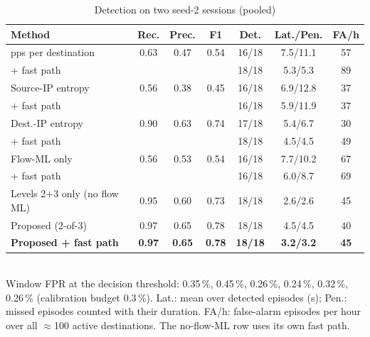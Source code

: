 \documentclass[conference]{IEEEtran}
\begin{document}
\begin{table}[t]
\caption{Detection on two seed-2 sessions (pooled)}
\label{tab:detect}
\centering
\setlength{\tabcolsep}{2.2pt}
\begin{tabular}{lcccccc}
\toprule
Method & Rec. & Prec. & F1 & Det. & Lat./Pen. & FA/h \\
\midrule
pps per destination & 0.63 & 0.47 & 0.54 & 16/18 & 7.5/11.1 & 57 \\
\quad + fast path & & & & 18/18 & 5.3/5.3 & 89 \\
Source-IP entropy & 0.56 & 0.38 & 0.45 & 16/18 & 6.9/12.8 & 37 \\
\quad + fast path & & & & 16/18 & 5.9/11.9 & 37 \\
Dest.-IP entropy~\cite{mousavi2015early} & 0.90 & 0.63 & 0.74 & 17/18 & 5.4/6.7 & 30 \\
\quad + fast path & & & & 18/18 & 4.5/4.5 & 49 \\
Flow-ML only & 0.56 & 0.53 & 0.54 & 16/18 & 7.7/10.2 & 67 \\
\quad + fast path & & & & 16/18 & 6.0/8.7 & 69 \\
Levels 2+3 only (no flow ML) & 0.95 & 0.60 & 0.73 & 18/18 & 2.6/2.6 & 45 \\
Proposed (2-of-3) & 0.97 & 0.65 & 0.78 & 18/18 & 4.5/4.5 & 40 \\
\textbf{Proposed + fast path} & \textbf{0.97} & \textbf{0.65} & \textbf{0.78} & \textbf{18/18} & \textbf{3.2/3.2} & \textbf{45} \\
\bottomrule
\end{tabular}\\[2pt]
\footnotesize Window FPR at the decision threshold: 0.35\,\%, 0.45\,\%, 0.26\,\%, 0.24\,\%, 0.32\,\%, 0.26\,\% (calibration budget 0.3\,\%). Lat.: mean over detected episodes (s); Pen.: missed episodes counted with their duration. FA/h: false-alarm episodes per hour over all $\approx$100 active destinations. The no-flow-ML row uses its own fast path.
\end{table}
\end{document}
